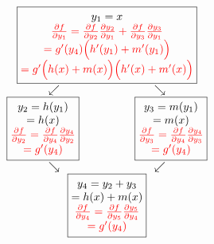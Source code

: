 \begin{equation*}
    \begin{matrix}
    \begin{matrix}
        \boxed{\begin{matrix}
            y_1=x \\
            \color{red}{\frac{\partial f}{\partial y_1} = \frac{\partial f}{\partial y_2}\frac{\partial y_2}{\partial y_1} + \frac{\partial f}{\partial y_3}\frac{\partial y_3}{\partial y_1}} \\
            \color{red}{= g'(y_4)\Bigl(h'(y_1) + m'(y_1)\Bigr)} \\
            \color{red}{= g'\Bigl(h(x) + m(x)\Bigr)\Bigl(h'(x) + m'(x)\Bigr)}
        \end{matrix}} \\
        \begin{matrix}
            \swarrow & \searrow \\
            \boxed{\begin{matrix}
                y_2=h(y_1) \\
                =h(x) \\
                \color{red}{\frac{\partial f}{\partial y_2} = \frac{\partial f}{\partial y_4}\frac{\partial y_4}{\partial y_2}} \\
                \color{red}{= g'(y_4)}
            \end{matrix}} \qquad & \qquad
            \boxed{\begin{matrix}
                y_3=m(y_1) \\
                =m(x) \\
                \color{red}{\frac{\partial f}{\partial y_3} = \frac{\partial f}{\partial y_4}\frac{\partial y_4}{\partial y_3}} \\
                \color{red}{= g'(y_4)}
            \end{matrix}} \\
            \searrow & \swarrow \\
        \end{matrix} \\
        \boxed{\begin{matrix}
            y_4 = y_2+y_3 \\
            = h(x) + m(x) \\
            \color{red}{\frac{\partial f}{\partial y_4} = \frac{\partial f}{\partial y_5}\frac{\partial y_5}{\partial y_4}} \\
            \color{red}{= g'(y_4)}
        \end{matrix}} \\

\end{matrix}
\end{matrix}
\end{equation*}
